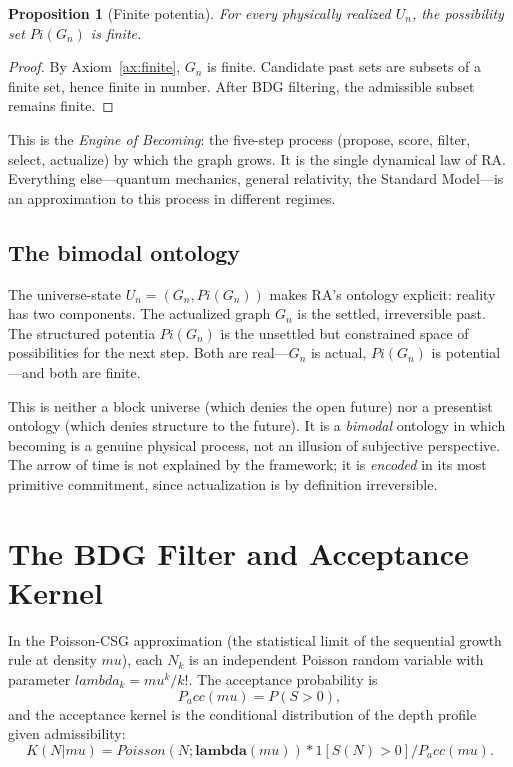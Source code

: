 \documentclass[11pt]{article}
\def\mu{mu}%
\def\Pi{Pi}%
\def\lambda{lambda}%
\def\mathrm#1{#1}%
\def\mathbf#1{#1}%
\def\mathbb#1{#1}%
\def\frac#1#2{#1/#2}%
\def\cdot{*}%
\def\Pacc{P_acc}%
\newtheorem{proposition}{Proposition}
\newcommand{\Pacc}{P_{\mathrm{acc}}}
\newcommand{\Pot}{\Pi}
\begin{document}
\begin{proposition}[Finite potentia]
For every physically realized $U_n$, the possibility set $\Pot(G_n)$ is finite.
\end{proposition}
\begin{proof}
By Axiom~\ref{ax:finite}, $G_n$ is finite. Candidate past sets are subsets of a finite set, hence finite in number. After BDG filtering, the admissible subset remains finite.
\end{proof}

This is the \emph{Engine of Becoming}: the five-step process (propose, score, filter, select, actualize) by which the graph grows. It is the single dynamical law of RA. Everything else---quantum mechanics, general relativity, the Standard Model---is an approximation to this process in different regimes.

\subsection{The bimodal ontology}

The universe-state $U_n=(G_n,\Pot(G_n))$ makes RA's ontology explicit: reality has two components. The actualized graph $G_n$ is the settled, irreversible past. The structured potentia $\Pot(G_n)$ is the unsettled but constrained space of possibilities for the next step. Both are real---$G_n$ is actual, $\Pot(G_n)$ is potential---and both are finite.

This is neither a block universe (which denies the open future) nor a presentist ontology (which denies structure to the future). It is a \emph{bimodal} ontology in which becoming is a genuine physical process, not an illusion of subjective perspective. The arrow of time is not explained by the framework; it is \emph{encoded} in its most primitive commitment, since actualization is by definition irreversible.

\section{The BDG Filter and Acceptance Kernel}
\label{sec:filter}

In the Poisson-CSG approximation (the statistical limit of the sequential growth rule at density $\mu$), each $N_k$ is an independent Poisson random variable with parameter $\lambda_k=\mu^k/k!$. The acceptance probability is
\begin{equation}
\Pacc(\mu)=\mathbb{P}(S>0),
\end{equation}
and the acceptance kernel is the conditional distribution of the depth profile given admissibility:
\begin{equation}
K(\mathbf{N}|\mu)=\frac{\mathrm{Poisson}(\mathbf{N};\boldsymbol{\lambda}(\mu))\cdot\mathbf{1}[S(\mathbf{N})>0]}{\Pacc(\mu)}.
\end{equation}
\end{document}
